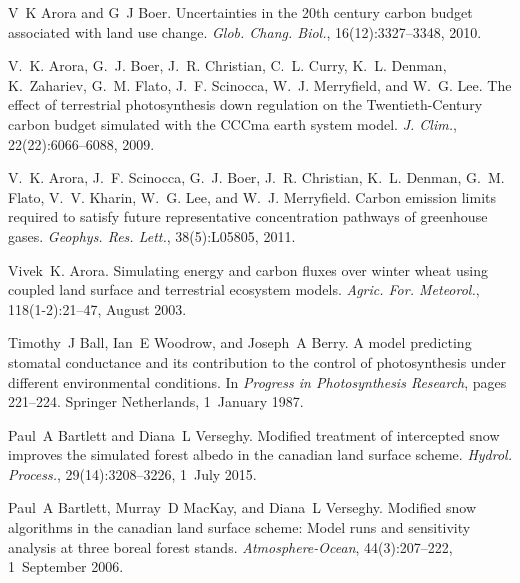 \begin{DoxyDescription}
\item[\label{_CITEREF_Arora2010-416}%
\mbox{[}9\mbox{]}]V~K Arora and G~J Boer. Uncertainties in the 20th century carbon budget associated with land use change. {\itshape Glob. Chang. Biol.}, 16(12)\+:3327--3348, 2010. 


\item[\label{_CITEREF_Arora2009-9bc}%
\mbox{[}10\mbox{]}]V.~K. Arora, G.~J. Boer, J.~R. Christian, C.~L. Curry, K.~L. Denman, K.~Zahariev, G.~M. Flato, J.~F. Scinocca, W.~J. Merryfield, and W.~G. Lee. The effect of terrestrial photosynthesis down regulation on the Twentieth-\/\+Century carbon budget simulated with the C\+C\+Cma earth system model. {\itshape J. Clim.}, 22(22)\+:6066--6088, 2009. 


\item[\label{_CITEREF_Arora2011-79f}%
\mbox{[}11\mbox{]}]V.~K. Arora, J.~F. Scinocca, G.~J. Boer, J.~R. Christian, K.~L. Denman, G.~M. Flato, V.~V. Kharin, W.~G. Lee, and W.~J. Merryfield. Carbon emission limits required to satisfy future representative concentration pathways of greenhouse gases. {\itshape Geophys. Res. Lett.}, 38(5)\+:L05805, 2011. 


\item[\label{_CITEREF_Arora2003-3b7}%
\mbox{[}12\mbox{]}]Vivek~K. Arora. Simulating energy and carbon fluxes over winter wheat using coupled land surface and terrestrial ecosystem models. {\itshape Agric. For. Meteorol.}, 118(1-\/2)\+:21--47, August 2003. 


\item[\label{_CITEREF_Ball1987-ou}%
\mbox{[}13\mbox{]}]Timothy~J Ball, Ian~E Woodrow, and Joseph~A Berry. A model predicting stomatal conductance and its contribution to the control of photosynthesis under different environmental conditions. In {\itshape Progress in Photosynthesis Research}, pages 221--224. Springer Netherlands, 1~January 1987. 


\item[\label{_CITEREF_Bartlett2015-gw}%
\mbox{[}14\mbox{]}]Paul~A Bartlett and Diana~L Verseghy. Modified treatment of intercepted snow improves the simulated forest albedo in the canadian land surface scheme. {\itshape Hydrol. Process.}, 29(14)\+:3208--3226, 1~July 2015. 


\item[\label{_CITEREF_Bartlett2006-xp}%
\mbox{[}15\mbox{]}]Paul~A Bartlett, Murray~D Mac\+Kay, and Diana~L Verseghy. Modified snow algorithms in the canadian land surface scheme\+: Model runs and sensitivity analysis at three boreal forest stands. {\itshape Atmosphere-\/\+Ocean}, 44(3)\+:207--222, 1~September 2006. 



\end{DoxyDescription}
